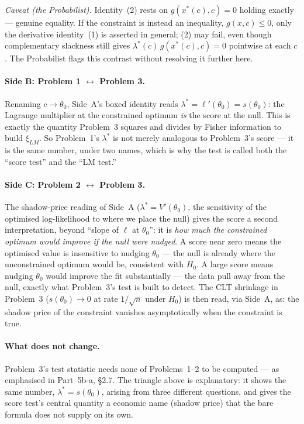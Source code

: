 \documentclass[a4paper,oneside,12pt]{extarticle}
\theoremstyle{plain}
\theoremstyle{definition}
\theoremstyle{remark}
\begin{document}
\emph{Caveat (the Probabilist).} Identity~(2) rests on $g(x^*(c),c)=0$ holding
exactly --- genuine equality. If the constraint is instead an
inequality, $g(x,c)\le 0$, only the derivative identity~(1) is
asserted in general; (2) may fail, even though complementary
slackness still gives $\lambda^*(c)\,g(x^*(c),c)=0$ pointwise at
each $c$. The Probabilist flags this contrast without resolving it further
here.

\paragraph{Side B: Problem 1 $\leftrightarrow$ Problem 3.}
Renaming $c\to\theta_0$, Side~A's boxed identity reads
$\lambda^*=\ell'(\theta_0)=s(\theta_0)$: the Lagrange multiplier at
the constrained optimum \emph{is} the score at the null. This is
exactly the quantity Problem~3 squares and divides by Fisher
information to build $\xi_{LM}$. So Problem~1's $\lambda^*$ is not
merely analogous to Problem~3's score --- it is the same number,
under two names, which is why the test is called both the
``score test'' and the ``LM test.''

\paragraph{Side C: Problem 2 $\leftrightarrow$ Problem 3.}
The shadow-price reading of Side~A ($\lambda^*=V'(\theta_0)$, the
sensitivity of the optimised log-likelihood to where we place the
null) gives the score a second interpretation, beyond ``slope of
$\ell$ at $\theta_0$'': it is \emph{how much the constrained optimum
would improve if the null were nudged}. A score near zero means the
optimised value is insensitive to nudging $\theta_0$ --- the null is
already where the unconstrained optimum would be, consistent with
$H_0$. A large score means nudging $\theta_0$ would improve the fit
substantially --- the data pull away from the null, exactly what
Problem~3's test is built to detect. The CLT shrinkage in Problem~3
($s(\theta_0)\to 0$ at rate $1/\sqrt n$ under $H_0$) is then read,
via Side~A, as: the shadow price of the constraint vanishes
asymptotically when the constraint is true.

\paragraph{What does not change.}
Problem~3's test statistic needs none of Problems~1--2 to be
computed --- as emphasised in Part~5b-a, \S2.7. The triangle above
is explanatory: it shows the same number, $\lambda^*=s(\theta_0)$,
arising from three different questions, and gives the score test's
central quantity a economic name (shadow price) that the bare
formula does not supply on its own.
\end{document}
